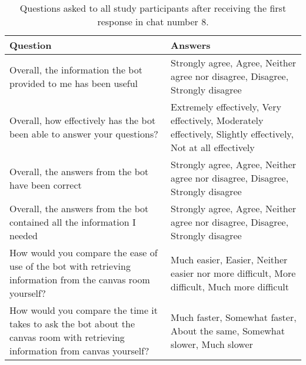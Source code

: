\renewcommand{\arraystretch}{1.5}
\begin{table}[H]
\centering
{\small
\begin{tabularx}{\textwidth}{@{}X X@{}}
\toprule
\textbf{Question} & \textbf{Answers} \\ \midrule
Overall, the information the bot provided to me has been useful & Strongly agree, Agree, Neither agree nor disagree, Disagree, Strongly disagree \\ \hdashline
Overall, how effectively has the bot been able to answer your questions? & Extremely effectively, Very effectively, Moderately effectively, Slightly effectively, Not at all effectively \\ \hdashline
Overall, the answers from the bot have been correct & Strongly agree, Agree, Neither agree nor disagree, Disagree, Strongly disagree \\ \hdashline
Overall, the answers from the bot contained all the information I needed & Strongly agree, Agree, Neither agree nor disagree, Disagree, Strongly disagree \\ \hdashline
How would you compare the ease of use of the bot with retrieving information from the canvas room yourself? & Much easier, Easier, Neither easier nor more difficult, More difficult, Much more difficult \\ \hdashline
How would you compare the time it takes to ask the bot about the canvas room with retrieving information from canvas yourself? & Much faster, Somewhat faster, About the same, Somewhat slower, Much slower \\
\bottomrule
\end{tabularx}
}
\vspace{2mm}
\caption{Questions asked to all study participants after receiving the first response in chat number 8.}
\label{tab:inserted_questions_8}
\end{table}
